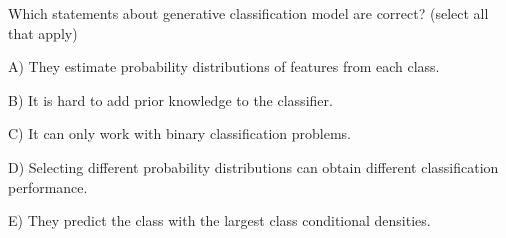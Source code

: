 Which statements about generative classification model are correct? (select all that apply)


A) They estimate probability distributions of features from each class.


B) It is hard to add prior knowledge to the classifier.


C) It can only work with binary classification problems.


D) Selecting different probability distributions can obtain different classification performance.


E) They predict the class with the largest class conditional densities.
